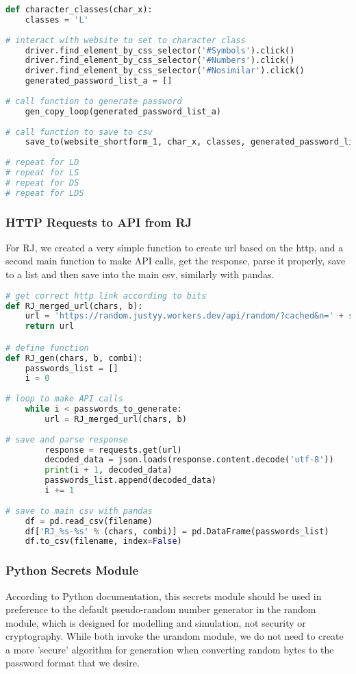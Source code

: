 \documentclass[letterpaper,twocolumn,10pt]{article}
\begin{document}
\begin{lstlisting}[language=python, frame=none]
def character_classes(char_x):
    classes = 'L'
    
# interact with website to set to character class
    driver.find_element_by_css_selector('#Symbols').click()
    driver.find_element_by_css_selector('#Numbers').click()
    driver.find_element_by_css_selector('#Nosimilar').click()
    generated_password_list_a = []
    
# call function to generate password
    gen_copy_loop(generated_password_list_a)
    
# call function to save to csv
    save_to(website_shortform_1, char_x, classes, generated_password_list_a)
    
# repeat for LD
# repeat for LS
# repeat for DS
# repeat for LDS
\end{lstlisting}

\subsubsection{HTTP Requests to API from RJ}
For RJ, we created a very simple function to create url based on the http, and a second main function to make API calls, get the response, parse it properly, save to a list and then save into the main csv, similarly with pandas.

\begin{lstlisting}[language=python, frame=none]
# get correct http link according to bits
def RJ_merged_url(chars, b):
    url = 'https://random.justyy.workers.dev/api/random/?cached&n=' + str(chars) + '&x=' + str(b) 
    return url

# define function
def RJ_gen(chars, b, combi):
    passwords_list = []
    i = 0
    
# loop to make API calls
    while i < passwords_to_generate:
        url = RJ_merged_url(chars, b)
        
# save and parse response
        response = requests.get(url)
        decoded_data = json.loads(response.content.decode('utf-8'))
        print(i + 1, decoded_data)
        passwords_list.append(decoded_data)
        i += 1
        
# save to main csv with pandas
    df = pd.read_csv(filename)
    df['RJ_%s-%s' % (chars, combi)] = pd.DataFrame(passwords_list)
    df.to_csv(filename, index=False)
\end{lstlisting}

\subsubsection{Python Secrets Module}
According to Python documentation\cite{secrets}, this secrets module should be used in preference to the default pseudo-random number generator in the random module, which is designed for modelling and simulation, not security or cryptography. While both invoke the urandom module, we do not need to create a more 'secure' algorithm for generation when converting random bytes to the password format that we desire.
\end{document}
